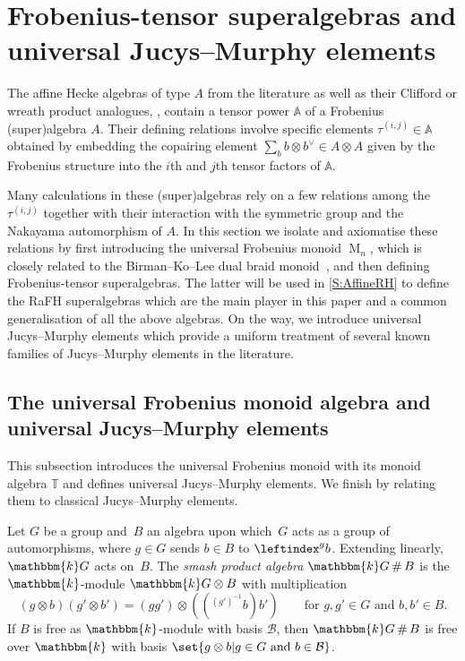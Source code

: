 \documentclass[a4paper,11pt]{amsart}
\newcommand\cB{\mathcal{B}}
\numberwithin{equation}{subsection}
\theoremstyle{definition}
\theoremstyle{theorem}
\theoremstyle{remark}
\newcommand\kk{\mathbbm{k}}
\newcommand\nBraid{\operatorname{M}^{\operatorname{}}}
\newcommand\Tos{\mathbb{T}}
\newcommand{\Ao}{\mathbb{A}}
\DeclareMathOperator\Smash{\#}
\begin{document}
\section{Frobenius-tensor superalgebras and universal Jucys--Murphy elements}
The  affine Hecke algebras of type $A$ from the literature as well as their Clifford or wreath product analogues,
\cite{IwahoriMatsumoto,Drinfield:DegenerateHecke,Nazarov,BKHeckeClifford,Savage:AffineWreath,RossoSavage:QuantumAffineWreath,KleshchevMuth},
contain a tensor power $\Ao$ of a Frobenius (super)algebra $A$. Their defining relations involve
specific elements $\tau^{(i,j)}\in\Ao$ obtained by embedding the copairing element $\sum_bb\otimes b^\vee\in A\otimes A$ given by the Frobenius structure into the $i$th and $j$th tensor factors of $\Ao$.

Many calculations  in these (super)algebras  rely on a few relations among the $\tau^{(i,j)}$ together with their interaction with the symmetric group and the Nakayama automorphism of $A$. In this section we isolate and axiomatise these relations by first introducing the universal Frobenius monoid $\nBraid_n$, which  is closely related to the Birman--Ko--Lee dual braid monoid~\cite{BirmanKoLee}, and then defining Frobenius-tensor superalgebras.  The latter will be used in \autoref{S:AffineRH} to define the
RaFH superalgebras which  are the main player in this paper and a common generalisation of all the above algebras. On the way, we  introduce universal Jucys--Murphy elements which provide a uniform treatment of several known families of Jucys--Murphy elements in the literature.


\subsection{The universal Frobenius monoid algebra and  universal Jucys--Murphy elements}\label{S:Smash}
This subsection introduces the universal Frobenius monoid with its
monoid algebra $\Tos$ and defines universal Jucys--Murphy elements. We
finish by relating them to classical Jucys--Murphy elements.

  Let $G$ be a group and~$B$ an algebra upon which~$G$ acts as a group of automorphisms, where $g\in G$ sends $b\in B$ to
  $\leftindex^g b$. Extending linearly, $\kk G$ acts on~$B$. The \emph{smash product algebra} $\kk G\Smash B$ is the $\kk$-module $\kk G\otimes B$ with multiplication
  \[
   (g\otimes b)(g'\otimes b')=(gg')\otimes\left(({}^{(g')^{-1}}b)b'\right)
          \qquad\text{for $g,g'\in G$ and $b,b'\in B$}.
  \]
  If $B$ is free as $\kk$-module with
  basis $\cB$, then $\kk G\Smash B$ is free over $\kk$
  with basis $\set{g\otimes b| g\in G\text{ and }b\in \cB}$.
\end{document}
